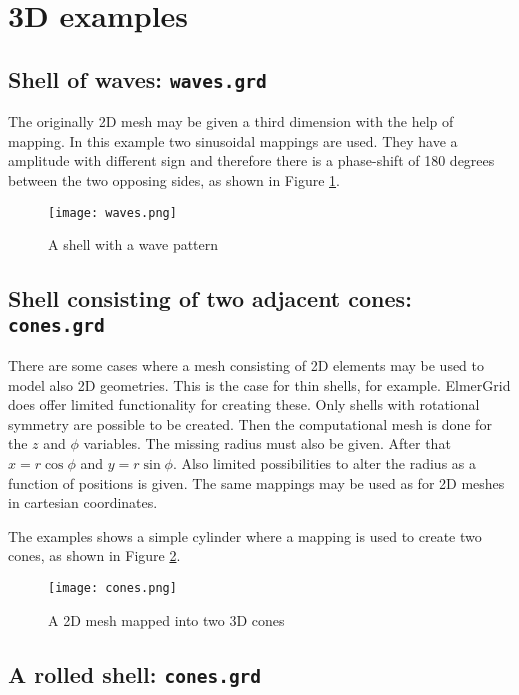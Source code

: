 \section{3D examples}

\subsection*{Shell of waves: \texttt{waves.grd}}

The originally 2D mesh may be given a third dimension with the help of mapping.
In this example two sinusoidal mappings are used. They have a amplitude
with different sign and therefore there is a phase-shift of 180 degrees between the 
two opposing sides, as shown in Figure \ref{fg:pic6}. 



\begin{figure}[H]
\centering
\texttt{[image: waves.png]}
\caption{A shell with a wave pattern}
\label{fg:pic6}
\end{figure}


\subsection*{Shell consisting of two adjacent cones: \texttt{cones.grd}}

There are some cases where a mesh consisting of 2D elements 
may be used to model also 2D geometries. This is the case for
thin shells, for example. ElmerGrid does offer limited 
functionality for creating these. Only 
shells with rotational symmetry are possible to be created. 
Then the computational mesh is done for the $z$ and $\phi$ variables.
The missing radius must also be given.
After that $x=r \cos \phi$ and $y= r \sin \phi$.
Also limited possibilities to alter the radius as 
a function of positions is given. The same mappings may be used
as for 2D meshes in cartesian coordinates.

The examples shows a simple cylinder where a mapping is
used to create two cones, as shown in Figure \ref{fg:pic7}. 



\begin{figure}[H]
\centering
\texttt{[image: cones.png]}
\caption{A 2D mesh mapped into two 3D cones}
\label{fg:pic7}
\end{figure}


\subsection*{A rolled shell: \texttt{cones.grd}}

